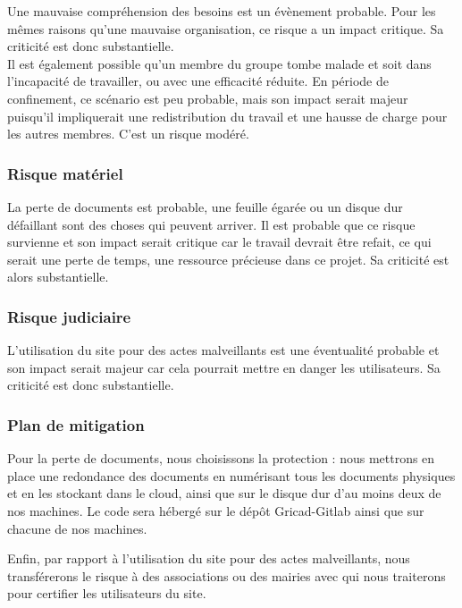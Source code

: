 \documentclass[a4paper,11pt]{article}
\begin{document}
Une mauvaise compréhension des besoins est un évènement probable. Pour les mêmes raisons
qu'une mauvaise organisation, ce risque a un impact critique. Sa criticité est donc substantielle.\\

Il est également possible qu'un membre du groupe tombe malade et soit dans l'incapacité de travailler, ou avec une efficacité réduite. En période de confinement, ce scénario est peu probable, mais son impact
serait majeur puisqu'il impliquerait une redistribution du travail et une hausse de charge pour les autres membres. C'est un risque modéré.\\

\subsubsection{Risque matériel}

La perte de documents est probable, une feuille égarée ou un disque dur défaillant sont des choses
qui peuvent arriver. Il est probable que ce risque survienne et son impact serait critique car le travail
devrait être refait, ce qui serait une perte de temps, une ressource précieuse dans
ce projet. Sa criticité est alors substantielle.\\

\subsubsection{Risque judiciaire}

L’utilisation du site pour des actes malveillants est une éventualité probable et son impact serait
majeur car cela pourrait mettre en danger les utilisateurs. Sa criticité est donc substantielle.\\

\subsubsection{Plan de mitigation}

Pour la perte de documents, nous choisissons la protection : nous mettrons en place une redondance
des documents en numérisant tous les documents physiques et en les stockant dans le cloud, ainsi
que sur le disque dur d’au moins deux de nos machines. Le code sera hébergé sur le dépôt Gricad-Gitlab ainsi que sur chacune de nos machines.

Enfin, par rapport à l’utilisation du site pour des actes malveillants, nous transférerons le risque à des
associations ou des mairies avec qui nous traiterons pour certifier les utilisateurs du site.
\end{document}
